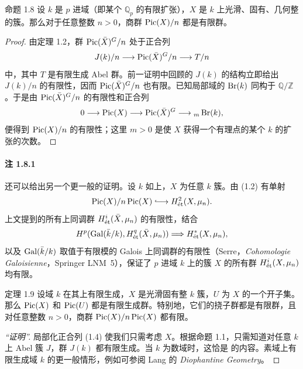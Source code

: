 \begin{statement}{命题 1.8}
设 $k$ 是 $p$ 进域（即某个 $\mathbb Q_p$ 的有限扩张），$X$ 是 $k$ 上光滑、固有、几何整的簇。那么对于任意整数 $n>0$，商群 $\operatorname{Pic}(X)/n$ 都是有限群。
\end{statement}
\begin{proof}
由定理 1.2，群 $\operatorname{Pic}(\bar X)^G/n$ 处于正合列
\[
J(k)/n\longrightarrow\operatorname{Pic}(\bar X)^G/n\longrightarrow T/n
\]
中，其中 $T$ 是有限生成 Abel 群。前一证明中回顾的 $J(k)$ 的结构立即给出 $J(k)/n$ 的有限性，因而 $\operatorname{Pic}(\bar X)^G/n$ 也有限。已知局部域的 $\operatorname{Br}(k)$ 同构于 $\mathbb Q/\mathbb Z$。于是由 $\operatorname{Pic}(\bar X)^G/n$ 的有限性和正合列
\[
0\longrightarrow\operatorname{Pic}(X)\longrightarrow\operatorname{Pic}(\bar X)^G\longrightarrow{}_m\operatorname{Br}(k),
\]
便得到 $\operatorname{Pic}(X)/n$ 的有限性；这里 $m>0$ 是使 $X$ 获得一个有理点的某个 $k$ 的扩张的次数。
\end{proof}
\paragraph{注 1.8.1}
还可以给出另一个更一般的证明。设 $k$ 如上，$X$ 为任意 $k$ 簇。由 (1.2) 有单射
\[
\Pic(X)/n\Pic(X)\lhook\joinrel\longrightarrow H^2_{\et}(X,\mu_n).
\]
上文提到的所有上同调群 $H^i_{\mathrm{\acute et}}(\bar X,\mu_n)$ 的有限性，结合 
\[
H^p(\operatorname{Gal}(\bar k/k),H^q_{\mathrm{\acute et}}(\bar X,\mu_n))\Longrightarrow H^*_{\mathrm{\acute et}}(X,\mu_n),
\]
以及 $\operatorname{Gal}(\bar k/k)$ 取值于有限模的 Galois 上同调群的有限性（Serre，\emph{Cohomologie Galoisienne}，Springer LNM~5），保证了 $p$ 进域 $k$ 上的簇 $X$ 的所有群 $H^i_{\mathrm{\acute et}}(X,\mu_n)$ 均有限。

\begin{statement}{定理 1.9}
设域 $k$ 在其上有限生成，$X$ 是光滑固有整 $k$ 簇，$U$ 为 $X$ 的一个开子集。那么 $\operatorname{Pic}(X)$ 和 $\operatorname{Pic}(U)$ 都是有限生成群。特别地，它们的挠子群都是有限群，且对任意整数 $n>0$，商群 $\operatorname{Pic}(X)/n\operatorname{Pic}(X)$ 都有限。
\end{statement}
\begin{proof}[“证明”]
局部化正合列 (1.4) 使我们只需考虑 $X$。根据命题 1.1，只需知道对任意 $k$ 上 Abel 簇 $J$，群 $J(k)$ 都有限生成。当 $k$ 为数域时，这恰是 的内容。素域上有限生成域 $k$ 的更一般情形，例如可参阅 Lang 的 \emph{Diophantine Geometry}。
\end{proof}
